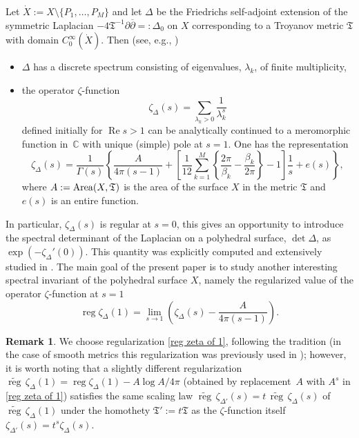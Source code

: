 \documentclass[pdftex]{sigma}
\numberwithin{equation}{section}
\theoremstyle{definition}
\newtheorem{Remark}[Theorem]{Remark}
\begin{document}
Let $\dot{X}:=X\setminus \{P_1, \dots, P_M\}$ and let $\Delta$ be the Friedrichs self-adjoint extension of the symmetric Laplacian $-4\mathfrak{T}^{-1}\partial\overline{\partial}=:\Delta_0$ on $X$ corresponding to a Troyanov metric $\mathfrak{T}$ with domain $C^\infty_0(\dot{X})$. Then (see, e.g., \cite{KokLN})
\begin{itemize}\itemsep=0pt
\item $\Delta$ has a discrete spectrum consisting of eigenvalues, $\lambda_k$, of finite multiplicity,
\item the operator $\zeta$-function
\begin{equation}
\label{zeta}
\zeta_\Delta(s)=\sum_{\lambda_k>0}\frac{1}{\lambda_k^s}
\end{equation}
defined initially for $\operatorname{Re} s>1$ can be analytically continued to a meromorphic function in~${\mathbb C}$ with unique (simple) pole at $s=1$. One has the representation
\begin{equation*}
\zeta_\Delta(s)=\frac{1}{\Gamma(s)}\left\{\frac{A}{4\pi(s-1)}+
\left[\frac{1}{12}\sum_{k=1}^M\left\{\frac{2\pi}{\beta_k}-\frac{\beta_k}{2\pi}\right\}-1 \right]\frac{1}{s}+e(s) \right\},
\end{equation*}
where $A:={\rm Area }(X,\mathfrak{T})$ is the area of the surface $X$ in the metric $\mathfrak{T}$ and $e(s)$ is an entire function.
\end{itemize}
In particular, $\zeta_\Delta(s)$ is regular at $s=0$, this gives an opportunity to introduce the spectral determinant of the Laplacian on a polyhedral surface, $\det \Delta$, as $\exp{(-\zeta_\Delta'(0))}$. This quantity was explicitly computed and extensively studied in \cite{KokTAMS,KokPAMS,KokKorJDG}. The main goal of the present paper is to study another interesting spectral invariant of the polyhedral surface $X$, namely the regularized value of the operator $\zeta$-function
at $s=1$
\begin{equation}
\label{reg zeta of 1}
\operatorname{reg}\zeta_\Delta(1)= \lim_{s\to 1} \left( \zeta_\Delta(s)-\frac{A}{4\pi(s-1)}\right) .
\end{equation}

\begin{Remark}
We choose regularization \eqref{reg zeta of 1}, following the tradition (in the case of smooth metrics this regularization was previously used in \cite{Okikitorus,Okikiolu,Steiner}); however, it is worth noting that a slightly different regularization $\widetilde{\operatorname{reg}}\,\zeta_\Delta(1)=\operatorname{reg}\zeta_\Delta(1)-A\log A/4\pi$ (obtained by replacement~$A$ with $A^s$ in \eqref{reg zeta of 1}) satisfies the same scaling law $\widetilde{\operatorname{reg}}\,\zeta_{\Delta'}(s)=t\, \widetilde{\operatorname{reg}}\,\zeta_{\Delta}(s)$ of $\widetilde{\operatorname{reg}}\,\zeta_\Delta(1)$ under the homothety $\mathfrak{T}':=t\mathfrak{T}$ as the $\zeta$-function itself $\zeta_{\Delta'}(s)=t^s\zeta_{\Delta}(s)$.
\end{Remark}
\end{document}
